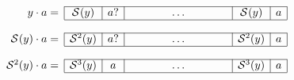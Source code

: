\documentclass[10pt]{article}
\begin{document}
\TeXtoEPS
\(
\begin{array}{r@{}ccccc}
\cline{2-6}
  \multicolumn{1}{r|}{y \cdot a =}
& \multicolumn{1}{c|}{\Border{}{y}}
& \multicolumn{1}{c|}{a?}
& \phantom{HHHH}\ldots\phantom{HHHH}
& \multicolumn{1}{|c|}{\Border{}{y}}
& \multicolumn{1}{c|}{a}\\
\cline{2-6}
&&&&&\\
\cline{2-6}
  \multicolumn{1}{r|}{\Border{}{y} \cdot a =}
& \multicolumn{1}{c|}{\Border{2}{y}}
& \multicolumn{1}{c|}{a?}
& \ldots
& \multicolumn{1}{|c|}{\Border{2}{y}}
& \multicolumn{1}{c|}{a}\\
\cline{2-6}
&&&&&\\
\cline{2-6}
  \multicolumn{1}{r|}{\Border{2}{y} \cdot a =}
& \multicolumn{1}{c|}{\Border{3}{y}}
& \multicolumn{1}{c|}{a}
& \ldots
& \multicolumn{1}{|c|}{\Border{3}{y}}
& \multicolumn{1}{c|}{a}\\
\cline{2-6}
\end{array}
\)
\endTeXtoEPS
\end{document}
